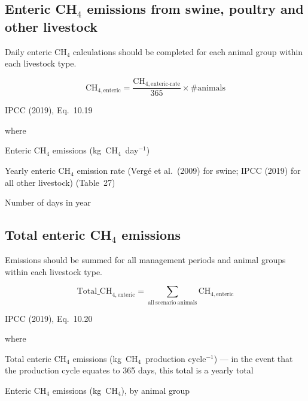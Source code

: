 \subsection{Enteric CH\texorpdfstring{$_4$}{4} emissions from swine, poultry and
other livestock}
\label{subsec:swine-enteric}

Daily enteric CH$_4$ calculations should be completed for each animal group within
each livestock type.

\begin{equation}
    \mathrm{CH}_{4,\mathrm{enteric}} =
        \frac{\mathrm{CH}_{4,\mathrm{enteric\text{-}rate}}}{365}
        \times \#\mathrm{animals}
    \tag{Eq.\ 3.4.1.1}
\end{equation}

\noindent IPCC (2019), Eq.~10.19

\noindent where
\begin{description}[font=\normalfont, leftmargin=9em, style=sameline, nosep]
    \item[$\mathrm{CH}_{4,\mathrm{enteric}}$] Enteric CH$_4$ emissions
          (kg~CH$_4$~day$^{-1}$)
    \item[$\mathrm{CH}_{4,\mathrm{enteric\text{-}rate}}$] Yearly enteric CH$_4$
          emission rate (Verg\'{e} et al.\ (2009) for swine; IPCC (2019) for all
          other livestock) (Table~27)
    \item[$365$] Number of days in year
\end{description}

\subsection{Total enteric CH\texorpdfstring{$_4$}{4} emissions}
\label{subsec:swine-total}

Emissions should be summed for all management periods and animal groups within each
livestock type.

\begin{equation}
    \mathrm{Total\_CH}_{4,\mathrm{enteric}} =
        \sum_{\mathrm{all\ scenario\ animals}}
        \mathrm{CH}_{4,\mathrm{enteric}}
    \tag{Eq.\ 3.4.2.1}
\end{equation}

\noindent IPCC (2019), Eq.~10.20

\noindent where
\begin{description}[font=\normalfont, leftmargin=9em, style=sameline, nosep]
    \item[$\mathrm{Total\_CH}_{4,\mathrm{enteric}}$] Total enteric CH$_4$ emissions
          (kg~CH$_4$~production cycle$^{-1}$) --- in the event that the production
          cycle equates to 365 days, this total is a yearly total
    \item[$\mathrm{CH}_{4,\mathrm{enteric}}$] Enteric CH$_4$ emissions (kg~CH$_4$),
          by animal group
\end{description}

